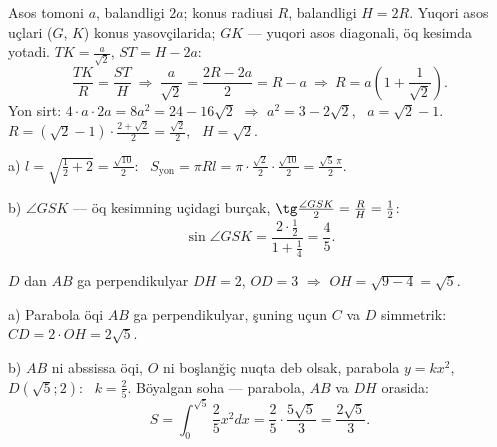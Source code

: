 \newpage
{}
Asos tomoni $a$, balandligi $2a$; konus radiusi $R$, balandligi $H=2R$. Yuqori asos uçlari ($G$, $K$) konus yasovçilarida; $GK$ — yuqori asos diagonali, öq kesimda yotadi. $TK=\frac{a}{\sqrt2}$, $ST=H-2a$:
\[\frac{TK}{R}=\frac{ST}{H}\ \Rightarrow\ \frac a{\sqrt2}=\frac{2R-2a}2=R-a\ \Rightarrow\ R=a\left(1+\frac1{\sqrt2}\right).\]
Yon sirt: $4\cdot a\cdot2a=8a^2=24-16\sqrt2$ $\Rightarrow$ $a^2=3-2\sqrt2$, \ $a=\sqrt2-1$.\\
$R=\left(\sqrt2-1\right)\cdot\frac{2+\sqrt2}2=\frac{\sqrt2}2$, \ $H=\sqrt2$.

a) $l=\sqrt{\frac12+2}=\frac{\sqrt{10}}2$: \ $S_{\text{yon}}=\pi Rl=\pi\cdot\frac{\sqrt2}2\cdot\frac{\sqrt{10}}2=\frac{\sqrt5\,\pi}2$.

b) $\angle GSK$ — öq kesimning uçidagi burçak, $\tg\frac{\angle GSK}2=\frac RH=\frac12$:
\[\sin\angle GSK=\frac{2\cdot\frac12}{1+\frac14}=\frac45.\]

\newpage
{}
$D$ dan $AB$ ga perpendikulyar $DH=2$, $OD=3$ $\Rightarrow$ $OH=\sqrt{9-4}=\sqrt5$.

a) Parabola öqi $AB$ ga perpendikulyar, şuning uçun $C$ va $D$ simmetrik: $CD=2\cdot OH=2\sqrt5$.

b) $AB$ ni abssissa öqi, $O$ ni boşlanğiç nuqta deb olsak, parabola $y=kx^2$, $D\left(\sqrt5;2\right)$: \ $k=\frac25$. Böyalgan soha — parabola, $AB$ va $DH$ orasida:
\[S=\int_0^{\sqrt5}\frac25x^2dx=\frac25\cdot\frac{5\sqrt5}3=\frac{2\sqrt5}3.\]

\ShowJavoblar

